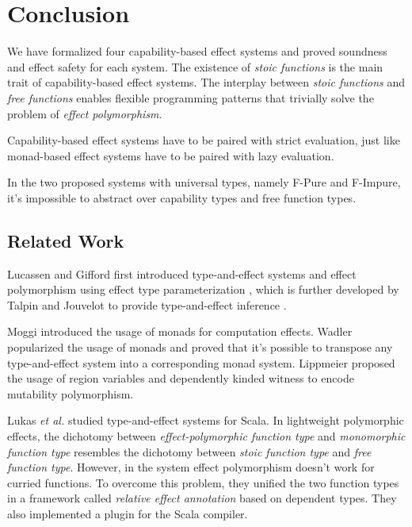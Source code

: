 \section{Conclusion}

We have formalized four capability-based effect systems and proved
soundness and effect safety for each system. The existence of
\emph{stoic functions} is the main trait of capability-based effect
systems. The interplay between \emph{stoic functions} and \emph{free
  functions} enables flexible programming patterns that trivially
solve the problem of \emph{effect polymorphism}.

Capability-based effect systems have to be paired with strict
evaluation, just like monad-based effect systems have to be paired
with lazy evaluation.

In the two proposed systems with universal types, namely F-Pure and
F-Impure, it's impossible to abstract over capability types and free
function types.

\subsection{Related Work}

Lucassen and Gifford first introduced type-and-effect
systems\cite{gifford1986integrating} and effect polymorphism using
effect type parameterization \cite{lucassen1988polymorphic}, which is
further developed by Talpin and Jouvelot to provide type-and-effect
inference \cite{talpin1992polymorphic, talpin1994type}.

Moggi introduced the usage of monads for computation
effects\cite{moggi1991notions}. Wadler popularized the usage of
monads\cite{wadler1992comprehending, wadler1995monads} and proved that
it's possible to transpose any type-and-effect system into a
corresponding monad system\cite{wadler2003marriage}. Lippmeier
proposed the usage of region variables and dependently kinded witness
to encode mutability polymorphism\cite{lippmeier2009witnessing}.

Lukas \emph{et al.}  studied type-and-effect systems for
Scala\cite{rytz2012lightweight, rytz2013flow, lukas2014effect}.  In
lightweight polymorphic effects\cite{rytz2012lightweight}, the
dichotomy between \emph{effect-polymorphic function type} and
\emph{monomorphic function type} resembles the dichotomy between
\emph{stoic function type} and \emph{free function type}. However, in
the system effect polymorphism doesn't work for curried functions. To
overcome this problem, they unified the two function types in a
framework called \emph{relative effect annotation} based on dependent
types. They also implemented a plugin for the Scala compiler.


